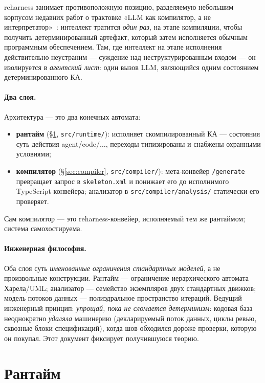 \documentclass[11pt]{article}
\theoremstyle{plain}
\theoremstyle{definition}
\theoremstyle{remark}
\newcommand{\reharness}{\textsf{reharness}}
\newcommand{\code}[1]{\texttt{#1}}
\begin{document}
\reharness{} занимает противоположную позицию, разделяемую небольшим корпусом недавних
работ о трактовке «LLM как компилятор, а не интерпретатор»~\cite{dspy,llmp,compiledai}:
интеллект тратится \emph{один раз}, на этапе компиляции, чтобы получить
детерминированный артефакт, который затем исполняется обычным программным обеспечением.
Там, где интеллект на этапе исполнения действительно неустраним --- суждение над
неструктурированным входом --- он изолируется в \emph{агентский лист}: один вызов LLM,
являющийся одним состоянием детерминированного КА.

\paragraph{Два слоя.} Архитектура --- это два конечных автомата:
\begin{itemize}[nosep]
  \item \textbf{рантайм} (\S\ref{sec:runtime}, \code{src/runtime/}): исполняет
        скомпилированный КА --- состояния суть действия agent/code/$\dots$, переходы
        типизированы и снабжены охранными условиями;
  \item \textbf{компилятор} (\S\ref{sec:compiler}, \code{src/compiler/}):
        мета-конвейер \code{/generate} превращает запрос в \code{skeleton.xml} и понижает
        его до исполнимого TypeScript-конвейера; анализатор в
        \code{src/compiler/analysis/} статически его проверяет.
\end{itemize}
Сам компилятор --- это \reharness{}-конвейер, исполняемый тем же рантаймом; система
самохостируема.

\paragraph{Инженерная философия.} Оба слоя суть \emph{именованные ограничения
стандартных моделей}, а не произвольные конструкции. Рантайм --- ограничение
иерархического автомата Харела/UML; анализатор --- семейство экземпляров двух
стандартных движков; модель потоков данных --- полиэдральное пространство итераций.
Ведущий инженерный принцип: \emph{упрощай, пока не сломается детерминизм}: кодовая база
неоднократно \emph{удаляла} машинерию (декларируемый поток данных, циклы ревью,
сквозные блоки спецификаций), когда шов обходился дороже проверки, которую он покупал.
Этот документ фиксирует получившуюся теорию.

\section{Рантайм}\label{sec:runtime}
\end{document}
